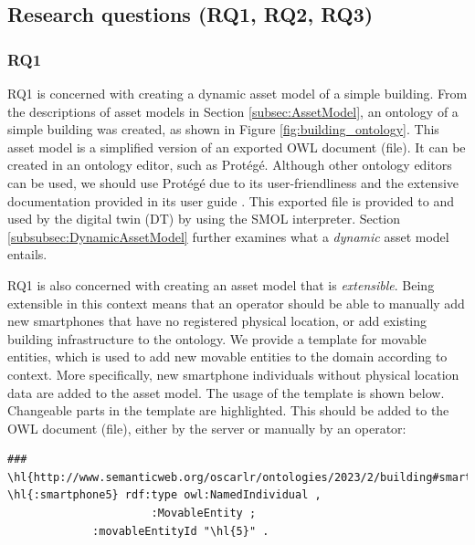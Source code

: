 \documentclass{article}
\begin{document}
\subsection{Research questions (RQ1, RQ2, RQ3)}
\subsubsection{RQ1}\label{subsubsec:RQ1}
RQ1 is concerned with creating a dynamic asset model of a simple building. From the descriptions of asset models in Section \ref{subsec:AssetModel}, an ontology of a simple building was created, as shown in Figure \ref{fig:building_ontology}. This asset model is a simplified version of an exported OWL document (file). It can be created in an ontology editor, such as Protégé. Although other ontology editors can be used, we should use Protégé due to its user-friendliness and the extensive documentation provided in its user guide \cite{horridge_practical_2011}. This exported file is provided to and used by the digital twin (DT) by using the SMOL interpreter. Section \ref{subsubsec:DynamicAssetModel} further examines what a \emph{dynamic} asset model entails.

RQ1 is also concerned with creating an asset model that is \emph{extensible}. Being extensible in this context means that an operator should be able to manually add new smartphones that have no registered physical location, or add existing building infrastructure to the ontology. We provide a template for movable entities, which is used to add new movable entities to the domain according to context. More specifically, new smartphone individuals without physical location data are added to the asset model. The usage of the template is shown below. Changeable parts in the template are highlighted. This should be added to the OWL document (file), either by the server or manually by an operator:

\begin{small}
\begin{Verbatim}[commandchars=\\\{\}, breakanywhere=true]
### \hl{http://www.semanticweb.org/oscarlr/ontologies/2023/2/building#smartphone5}
\hl{:smartphone5} rdf:type owl:NamedIndividual ,
                      :MovableEntity ;
             :movableEntityId "\hl{5}" .
\end{Verbatim}
\end{small}
\end{document}
